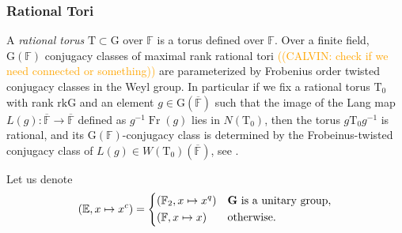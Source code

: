 \documentclass[12pt, reqno]{amsart}
\theoremstyle{definition}
\theoremstyle{definition}
\theoremstyle{definition}
\newcommand{\involution}[1]{#1^{c}}
\newcommand{\finiteField}{\mathbb{F}}
\newcommand{\quadraticExtension}{\mathbb{E}}
\newcommand{\finiteFieldExtension}[1]{\finiteField_{#1}}
\newcommand{\algebraicClosure}[1]{\overline{#1}}
\newcommand{\Frobenius}{\operatorname{Fr}}
\newcommand{\algebraicGroup}[1]{\boldsymbol{\mathrm{#1}}}
\newcommand{\calvin}[1]{\textcolor{orange}{\sffamily ((CALVIN: #1))}}
\begin{document}
\subsubsection{Rational Tori}\label{subsubsec:rational-tori}
A \emph{rational torus} $\algebraicGroup{T} \subset \algebraicGroup{G}$ over $\finiteField$ is a torus defined over $\finiteField$. 
Over a finite field, $\algebraicGroup{G}(\finiteField)$ conjugacy classes of maximal rank rational tori \calvin{check if we need connected or something} are parameterized by  Frobenius order twisted conjugacy classes in the Weyl group. In particular if we fix a rational torus $\algebraicGroup{T}_0$ with rank $\mathrm{rk} \algebraicGroup{G}$ and an element $g \in \algebraicGroup{G}(\algebraicClosure{\finiteField})$ such that the image of the Lang map $L(g):\algebraicGroup{\algebraicClosure{\finiteField}} \to \algebraicGroup{\algebraicClosure{\finiteField}}$ defined as $g^{-1}\Frobenius(g)$ lies in $N(\algebraicGroup{T}_0)$, then the torus $g\algebraicGroup{T}_0g^{-1}$ is rational, and its $\algebraicGroup{G}(\finiteField)$-conjugacy class is determined  by the Frobeinus-twisted conjugacy class of $L\left(g\right) \in W(\algebraicGroup{T}_0)(\algebraicClosure{\mathbb{F}})$, see \cite[Section 3.3]{Carter1985}.



Let us denote $$\left(\quadraticExtension, x \mapsto \involution{x}\right) = \begin{dcases}
	\left(\finiteFieldExtension{2}, x \mapsto x^q\right)  & \algebraicGroup{G} \text{ is a unitary group},\\
	\left(\finiteField, x \mapsto x\right) & \text{otherwise.}
\end{dcases}$$
\end{document}
